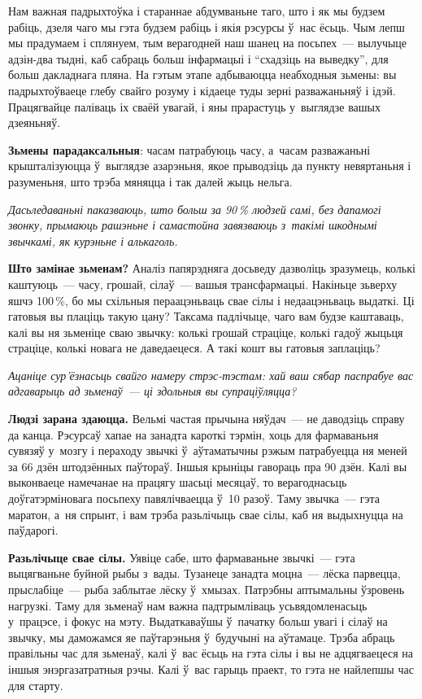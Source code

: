 Нам важная падрыхтоўка і стараннае абдумваньне таго, што і як мы будзем рабіць, дзеля чаго мы гэта будзем рабіць і якія рэсурсы ў~нас ёсьць. Чым лепш мы прадумаем і сплянуем, тым верагодней наш шанец на посьпех~--- вылучыце адзін-два тыдні, каб сабраць больш інфармацыі і ``схадзіць на выведку'', для больш дакладнага пляна. На гэтым этапе адбываюцца неабходныя зьмены: вы падрыхтоўваеце глебу свайго розуму і кідаеце туды зерні разважаньняў і ідэй. Працягвайце паліваць іх сваёй увагай, і яны прарастуць у~выглядзе вашых дзеяньняў.


\textbf{Зьмены парадаксальныя}: часам патрабуюць часу, а~часам разважаньні крышталізуюцца ў~выглядзе азарэньня, якое прыводзіць да пункту невяртаньня і разуменьня, што трэба мяняцца і так далей жыць нельга.

\emph{Дасьледаваньні паказваюць, што больш за 90\,\% людзей самі, без дапамогі звонку, прымаюць рашэньне і самастойна завязваюць з~такімі шкоднымі звычкамі, як курэньне і алькаголь.} 

\textbf{Што замінае зьменам?} Аналіз папярэдняга досьведу дазволіць зразумець, колькі каштуюць~--- часу, грошай, сілаў~--- вашыя трансфармацыі. Накіньце зьверху яшчэ 100\,\%, бо мы схільныя пераацэньваць свае сілы і недаацэньваць выдаткі. Ці гатовыя вы плаціць такую цану? Таксама падлічыце, чаго вам будзе каштаваць, калі вы ня зьменіце сваю звычку: колькі грошай страціце, колькі гадоў жыцьця страціце, колькі новага не даведаецеся. А такі кошт вы гатовыя заплаціць? 

\emph{Ацаніце сур'ёзнасьць свайго намеру стрэс-тэстам: хай ваш сябар паспрабуе вас адгаварыць ад зьменаў~--- ці здольныя вы супраціўляцца?} 

\textbf{Людзі зарана здаюцца.} Вельмі частая прычына няўдач~--- не даводзіць справу да канца. Рэсурсаў хапае на занадта кароткі тэрмін, хоць для фармаваньня сувязяў у~мозгу і пераходу звычкі ў~аўтаматычны рэжым патрабуецца ня меней за 66 дзён штодзённых паўтораў. Іншыя крыніцы гавораць пра 90 дзён. Калі вы выконваеце намечанае на працягу шасьці месяцаў, то верагоднасьць доўгатэрміновага посьпеху павялічваецца ў~10 разоў. Таму звычка~--- гэта маратон, а~ня спрынт, і вам трэба разьлічыць свае сілы, каб ня выдыхнуцца на паўдарогі.

\textbf{Разьлічыце свае сілы.} Уявіце сабе, што фармаваньне звычкі~--- гэта выцягваньне буйной рыбы з~вады. Тузанеце занадта моцна~--- лёска парвецца, прыслабіце~--- рыба заблытае лёску ў~хмызах. Патрэбны аптымальны ўзровень нагрузкі. Таму для зьменаў нам важна падтрымліваць усьвядомленасьць у~працэсе, і фокус на мэту. Выдаткаваўшы ў~пачатку больш увагі і сілаў на звычку, мы даможамся яе паўтарэньня ў~будучыні на аўтамаце. Трэба абраць правільны час для зьменаў, калі ў~вас ёсьць на гэта сілы і вы не адцягваецеся на іншыя энэргазатратныя рэчы. Калі ў~вас гарыць праект, то гэта не найлепшы час для старту.

